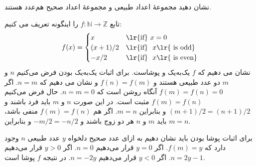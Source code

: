 
نشان دهید مجموعهٔ اعداد طبیعی و مجموعهٔ اعداد صحیح هم‌عدد هستند.
\begin{ans}
    تابع 
    $f:\mathbb{N}\to\mathbb{Z}$
    را اینگونه تعریف می کنیم:
    \[
    f(x) = 
    \begin{cases}
        x & \text{\lr{if}} \ x = 0\\
        (x+1)/2 & \text{\lr{if}} \ \ x \text{\lr{ is odd}}\\
        -x/2 & \text{\lr{if}} \ \ x \text{\lr{ is even}}\\
    \end{cases}
    \]
    نشان می دهیم که 
    $f$
    یک‌به‌یک و پوشاست. برای اثبات یک‌به‌یک بودن فرض می‌کنیم
    $n$
    و
    $m$
    دو عدد طبیعی هستند و 
    $f(n) = f(m)$
    و نشان می دهیم که 
    $n = m$.
    اگر 
    $f(m)=f(n) = 0$
    آنگاه روشن است که
    $n = m = 0$.
    حال فرض می‌کنیم $f(m)=f(n)$ مثبت است.
    در این صورت $n$ و $m$ باید فرد باشند و
    $(m+1)/2=(n+1)/2$
    و بنابراین
    $m=n$.
    اگر هم
    $f(m)=f(n)$
    منفی باشد، باید
    $m$
    و
    $n$
    هر دو زوج باشند و
    $-m/2=-n/2$
    و بنابراین
    $m=n$.

    برای اثبات پوشا بودن باید نشان دهیم به ازای عدد صحیح دلخواه
    $y$
    عدد طبیعی
    $n$
    وجود دارد که 
    $f(m) = y$.
    اگر
    $y = 0$
    قرار می‌دهیم
    $n=0$.
    اگر
    $y>0$
    قرار می‌دهیم
    $n=2y-1$.
    اگر
    $y<0$
    قرار می‌دهیم
    $n=-2y$.
    در نتیجه
    $f$
    پوشا است.
\end{ans}
